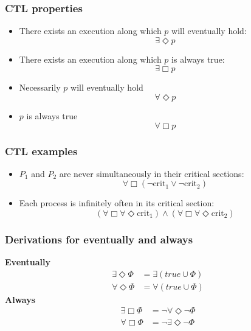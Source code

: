 \documentclass[11pt]{article}
\theoremstyle{definition}
\begin{document}
\subsubsection{CTL properties}
\begin{itemize}
\item There exists an execution along which $p$ will eventually hold:
\begin{equation}
\exists \Diamond p
\end{equation}
\item There exists an execution along which $p$ is always true:
\begin{equation}
\exists \Box p
\end{equation}
\item Necessarily $p$ will eventually hold
\begin{equation}
\forall \Diamond p
\end{equation}
\item $p$ is always true
\begin{equation}
\forall \Box p
\end{equation}
\end{itemize}

\subsubsection{CTL examples}
\begin{itemize}
\item $P_{1}$ and $P_{2}$ are never simultaneously in their critical sections:
\begin{equation}
\forall \Box (\neg \text{crit}_{1} \vee \neg \text{crit}_{2})
\end{equation}

\item Each process is infinitely often in its critical section:
\begin{equation}
(\forall \Box \forall \Diamond \text{crit}_{1}) \wedge (\forall \Box \forall \Diamond \text{crit}_{2})
\end{equation}
\end{itemize}

\subsubsection{Derivations for eventually and always}
\textbf{Eventually}
\begin{align*}
\exists \Diamond \Phi &= \exists (true \cup \Phi) \\
\forall \Diamond \Phi &= \forall (true \cup \Phi)
\end{align*}
\textbf{Always}
\begin{align*}
\exists \Box \Phi &= \neg \forall \Diamond \neg \Phi \\
\forall \Box \Phi &= \neg \exists \Diamond \neg \Phi 
\end{align*}
\end{document}
